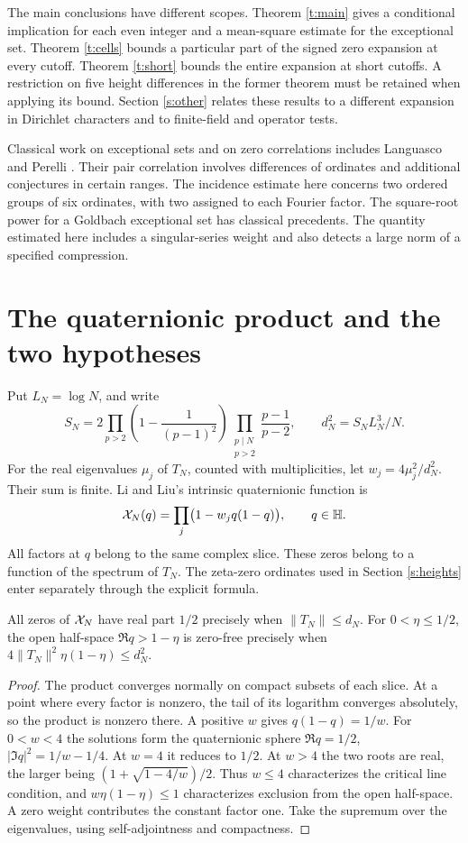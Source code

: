 \documentclass[11pt,a4paper]{article}
\begin{document}
The main conclusions have different scopes. Theorem \ref{t:main} gives a conditional implication for each even integer and a mean-square estimate for the exceptional set. Theorem \ref{t:cells} bounds a particular part of the signed zero expansion at every cutoff. Theorem \ref{t:short} bounds the entire expansion at short cutoffs. A restriction on five height differences in the former theorem must be retained when applying its bound. Section \ref{s:other} relates these results to a different expansion in Dirichlet characters and to finite-field and operator tests.

Classical work on exceptional sets and on zero correlations includes Languasco and Perelli \cite{LP}. Their pair correlation involves differences of ordinates and additional conjectures in certain ranges. The incidence estimate here concerns two ordered groups of six ordinates, with two assigned to each Fourier factor. The square-root power for a Goldbach exceptional set has classical precedents. The quantity estimated here includes a singular-series weight and also detects a large norm of a specified compression.

\section{The quaternionic product and the two hypotheses}\label{s:quat}
Put \(L_N=\log N\), and write
\[
 S_N=2\prod_{p>2}\left(1-\frac1{(p-1)^2}\right)
          \prod_{\substack{p\mid N\\p>2}}\frac{p-1}{p-2},\qquad
 d_N^2=S_N L_N^3/N .
\]
For the real eigenvalues \(\mu_j\) of \(T_N\), counted with multiplicities, let \(w_j=4\mu_j^2/d_N^2\). Their sum is finite. Li and Liu's intrinsic quaternionic function is
\[
 {\cal X}_N(q)=\prod_j\bigl(1-w_j q(1-q)\bigr),\qquad q\in\mathbb H.
\]
All factors at \(q\) belong to the same complex slice. These zeros belong to a function of the spectrum of \(T_N\). The zeta-zero ordinates used in Section \ref{s:heights} enter separately through the explicit formula.

\begin{prop}\label{p:quat}
All zeros of \({\cal X}_N\) have real part \(1/2\) precisely when \(\|T_N\|\le d_N\). For \(0<\eta\le1/2\), the open half-space \(\Re q>1-\eta\) is zero-free precisely when \(4\|T_N\|^2\eta(1-\eta)\le d_N^2\).
\end{prop}
\begin{proof}
The product converges normally on compact subsets of each slice. At a point where every factor is nonzero, the tail of its logarithm converges absolutely, so the product is nonzero there. A positive \(w\) gives \(q(1-q)=1/w\). For \(0<w<4\) the solutions form the quaternionic sphere \(\Re q=1/2\), \(|\Im q|^2=1/w-1/4\). At \(w=4\) it reduces to \(1/2\). At \(w>4\) the two roots are real, the larger being \((1+\sqrt{1-4/w})/2\). Thus \(w\le4\) characterizes the critical line condition, and \(w\eta(1-\eta)\le1\) characterizes exclusion from the open half-space. A zero weight contributes the constant factor one. Take the supremum over the eigenvalues, using self-adjointness and compactness.
\end{proof}
\end{document}
